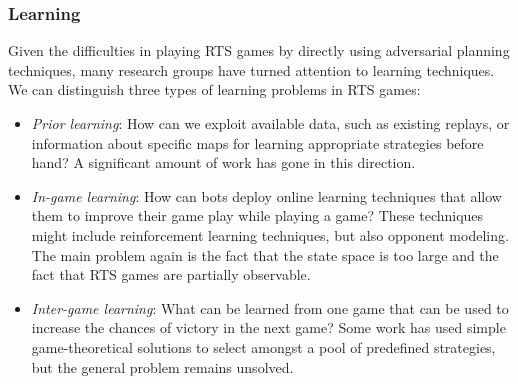 \documentclass{llncs}
\begin{document}
\subsubsection{Learning}
Given  the  difficulties  in  playing  RTS  games  by  directly  using
adversarial  planning techniques,  many  research  groups have  turned
attention to  learning techniques. We  can distinguish three  types of
learning problems in RTS games:
\begin{itemize}
\item {\em Prior learning}: How can we exploit available data, such as
  existing replays,  or information  about specific maps  for learning
  appropriate strategies before hand? A significant amount of work has
  gone in this
  direction.%
\item  {\em In-game  learning}: How  can bots  deploy online  learning
  techniques that allow them to  improve their game play while playing
  a  game?  These  techniques  might  include  reinforcement  learning
  techniques, but  also opponent modeling.  The main problem  again is
  the fact  that the state  space is too large  and the fact  that RTS
  games are partially observable.
\item {\em  Inter-game learning}:  What can be  learned from  one game
  that can  be used  to increase  the chances of  victory in  the next
  game? Some work has used simple game-theoretical solutions to select
  amongst a  pool of  predefined strategies,  but the  general problem
  remains unsolved.
\end{itemize}

\end{document}
